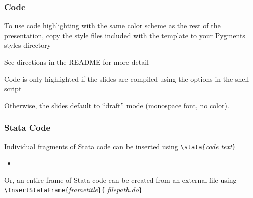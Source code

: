 \documentclass[aspectratio=169,handout]{beamer}
\begin{document}
%
%






\begin{frame}
	\frametitle{Code}
	\begin{witem}
		\item To use code highlighting with the same color scheme as
			the rest of the presentation, copy the style files included
			with the template to your Pygments styles directory
		\item See directions in the README for more detail
		\item Code is only highlighted if the slides are compiled using the
			options in the shell script
		\item Otherwise, the slides default to ``draft'' mode (monospace font,
			no color).
	\end{witem}
\end{frame}

\begin{frame}
	\frametitle{Stata Code}
	\begin{witem}
		\item Individual fragments of Stata code can be
			inserted using \texttt{\textbackslash{}stata\{}\textit{code text}\texttt{\}}
			\begin{itemize}
				\item {}
			\end{itemize}
		\item Or, an entire frame of Stata code can be created from an external file
			using
			\texttt{\textbackslash{}InsertStataFrame\{}\textit{frametitle}\texttt{\}\{}
\textit{filepath.do}\texttt{\}}
	\end{witem}
\end{frame}



\end{document}
